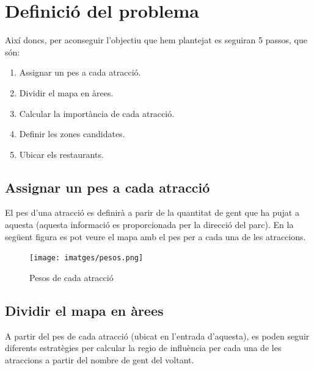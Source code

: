 \documentclass[12pt]{article}
\begin{document}
\clearpage
\section{Definició del problema}
Així doncs, per aconseguir l'objectiu que hem plantejat es seguiran 5 passos, que són:
\begin{enumerate}
	\item Assignar un pes a cada atracció.
	\item Dividir el mapa en àrees.
	\item Calcular la importància de cada atracció.
	\item Definir les zones candidates.
	\item Ubicar els restaurants.
\end{enumerate}

\subsection{Assignar un pes a cada atracció}
El pes d'una atracció es definirà a parir de la quantitat de gent que ha pujat a aquesta (aquesta informació es proporcionada per la direcció del parc). En la següent figura es pot veure el mapa amb el pes per a cada una de les atraccions.

\begin{figure}[H]
	\centering
	\texttt{[image: imatges/pesos.png]}\par\vspace{1cm}
	\caption{Pesos de cada atracció}
	\label{fig:mapa_areas}
\end{figure}

\subsection{Dividir el mapa en àrees \label{arees}}
A partir del pes de cada atracció (ubicat en l'entrada d'aquesta), es poden seguir diferents estratègies per calcular la regio de influència per cada una de les atraccions a partir del nombre de gent del voltant.
\end{document}
